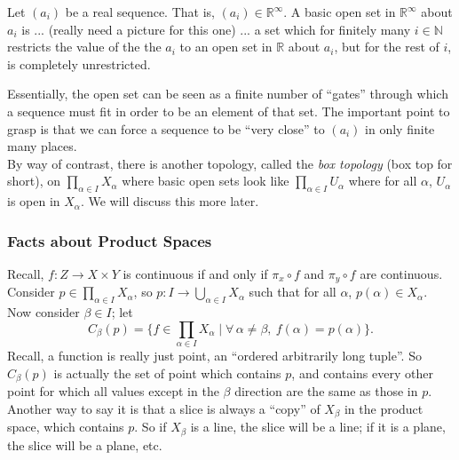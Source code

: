 \documentclass[12pt]{report}
\newcommand{\fall}{\forall\,}
\newcommand{\unionover}[2]{\bigcup_{#1 \in #2 }}
\newcommand{\productover}[2]{\prod_{#1 \in #2}}
\newcommand{\reals}{\mathbb{R}}
\newcommand{\naturals}{\mathbb{N}}
\begin{document}
Let $(a_i)$ be a real sequence. That is, $(a_i) \in \reals^\infty$. A basic open
set in $\reals^\infty$ about $a_i$ is ... (really need a picture for this one)
... a set which for finitely many $i \in \naturals$ restricts the value of the
the $a_i$ to an open set in $\reals$ about $a_i$, but for the rest of $i$, is
completely unrestricted.


Essentially, the open set can be seen as a finite number of ``gates'' through
which a sequence must fit in order to be an element of that set. The important
point to grasp is that we can force a sequence to be  ``very close'' to
$(a_i)$ in only  finite many places.\\

By way of contrast, there is another topology, called the 
{\em box topology} (box top for short), on $\productover{\alpha}{I}X_\alpha$
where basic open sets look like $\productover{\alpha}{I}U_\alpha$ where for all
$\alpha$, $U_\alpha$ is open in $X_\alpha$. We will discuss this more later.\\

\subsubsection{Facts about Product Spaces}

Recall, $f: Z \rightarrow X \times Y$ is continuous if and only if $\pi_x
\circ f$ and $\pi_y \circ f$ are continuous.\\


Consider $p \in \productover{\alpha}{I}X_\alpha$, so 
$p:I\rightarrow \unionover{\alpha}{I}X_\alpha$ such that for all $\alpha$, 
$p(\alpha) \in X_\alpha$. Now consider $\beta \in I$; let 
\begin{displaymath}
C_\beta(p) = \{f \in \productover{\alpha}{I}X_\alpha \mid \fall \alpha \neq
\beta,\ f(\alpha) = p(\alpha)\}.
\end{displaymath}
Recall, a function is really just point, an ``ordered arbitrarily long
tuple''. So $C_\beta(p)$ is actually the set of point which contains $p$, and
contains every other point for which all values except in the $\beta$
direction are the same as those in $p$. Another way to say it is that a slice
is always a ``copy'' of $X_\beta$ in the product space, which contains $p$.
So if $X_\beta$ is a line, the slice will be a line; if it is a plane, the
slice will be a plane, etc.
\end{document}
